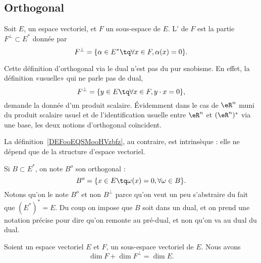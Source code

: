 \subsection{Orthogonal}

\begin{definition}      \label{DEFooEQSMooHVzbfz}
	Soit \( E\), un espace vectoriel, et \( F\) un sous-espace de \( E\). L' de \( F\) est la partie \( F^{\perp}\subset E^*\) donnée par
	\begin{equation}    \label{Eqiiyple}
		F^{\perp}=\{ \alpha\in E^*\tq \forall x\in F,\alpha(x)=0 \}.
	\end{equation}
\end{definition}

Cette définition d'orthogonal via le dual n'est pas du pur snobisme. En effet, la définition «usuelle» qui ne parle pas de dual,
\begin{equation}
	F^{\perp}=\{ y\in E\tq \forall x\in F,y\cdot x=0 \},
\end{equation}
demande la donnée d'un produit scalaire. Évidemment dans le cas de \( \eR^n\) muni du produit scalaire usuel et de l'identification usuelle entre \( \eR^n\) et \( (\eR^n)^*\) via une base, les deux notions d'orthogonal coïncident.

La définition~\ref{DEFooEQSMooHVzbfz}, au contraire, est intrinsèque : elle ne dépend que de la structure d'espace vectoriel.

Si \( B\subset E^*\), on note \( B^o\) son orthogonal :
\begin{equation}
	B^o=\{ x\in E\tq \omega(x)=0, \forall\omega\in B \}.
\end{equation}
Notons qu'on le note \( B^o\) et non \( B^{\perp}\) parce qu'on veut un peu s'abstraire du fait que \( (E^*)^*=E\). Du coup on impose que \( B\) soit dans un dual, et on prend une notation précise pour dire qu'on remonte au pré-dual, et non qu'on va au dual du dual.

\begin{proposition} \label{PropXrTDIi}
	Soient un espace vectoriel \( E\) et \( F\), un sous-espace vectoriel de \( E\). Nous avons
	\begin{equation}
		\dim F+\dim F^{\perp}=\dim E.
	\end{equation}
\end{proposition}

